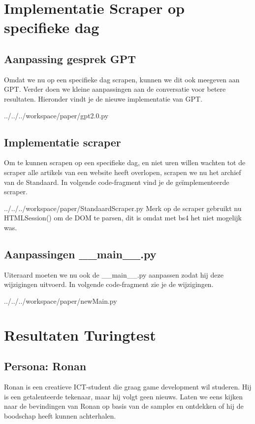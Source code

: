\section{Implementatie Scraper op specifieke dag}
\label{bijlage:changes_scraper}
\subsection{Aanpassing gesprek GPT}
Omdat we nu op een specifieke dag scrapen, kunnen we dit ook meegeven aan GPT. Verder doen we kleine aanpassingen aan de conversatie voor betere resultaten. Hieronder vindt je de nieuwe implementatie van GPT. 
\begin{pythoncode}{../../../workspace/paper/gpt2.0.py}
\end{pythoncode}

\subsection{Implementatie scraper}
Om te kunnen scrapen op een specifieke dag, en niet uren willen wachten tot de scraper alle artikels van een website heeft overlopen, scrapen we nu het archief van de Standaard. In volgende code-fragment vind je de geïmplementeerde scraper. 
\begin{pythoncode}{../../../workspace/paper/StandaardScraper.py}
    Merk op de scraper gebruikt nu HTMLSession() om de DOM te parsen, dit is omdat met bs4 het niet mogelijk was. 
\end{pythoncode}

\subsection{Aanpassingen \_\_main\_\_.py}
Uiteraard moeten we nu ook de \_\_main\_\_.py aanpassen zodat hij deze wijzigingen uitvoerd. In volgende code-fragment zie je de wijzigingen. 

\begin{pythoncode}{../../../workspace/paper/newMain.py}

\end{pythoncode}

\section{Resultaten Turingtest}
\label{bijlage:result_turingtest}
\subsection{Persona: Ronan}
Ronan is een creatieve ICT-student die graag game development wil studeren. Hij is een getalenteerde tekenaar, maar hij volgt geen nieuws. Laten we eens kijken naar de bevindingen van Ronan op basis van de samples en ontdekken of hij de boodschap heeft kunnen achterhalen.

